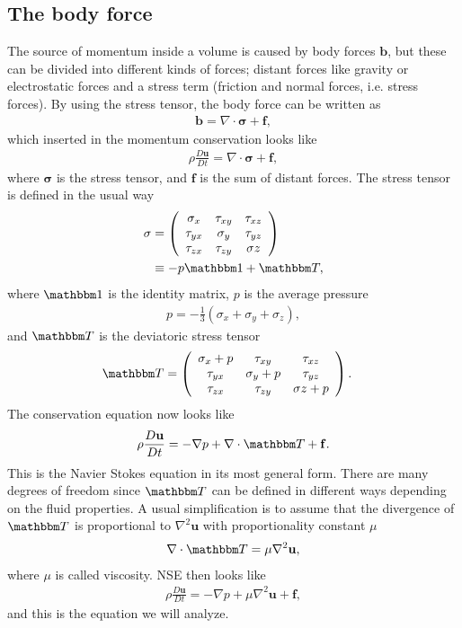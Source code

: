 \documentclass[a4paper,10pt]{article}
\renewcommand{\vec}[1]{\mathbf{#1}}
\renewcommand{\(}{\left(}
\renewcommand{\)}{\right)}
\begin{document}
\subsection{The body force}
The source of momentum inside a volume is caused by body forces $\vec b$, but these can be divided into different kinds of forces; distant forces like gravity or electrostatic forces and a stress term (friction and normal forces, i.e. stress forces). By using the stress tensor, the body force can be written as
\begin{align*}
  \vec b = \nabla \cdot \vec \sigma + \vec f,
\end{align*}
which inserted in the momentum conservation looks like
\begin{align*}
  \rho \frac{D\vec u}{D t} = \nabla \cdot \vec \sigma + \vec f,
\end{align*}
where $\vec \sigma$ is the stress tensor, and $\vec f$ is the sum of distant forces. The stress tensor is defined in the usual way
\begin{align*}
  \vec \sigma &= 
  \left (
  \begin{array}{c c c}
  \sigma_x & \tau_{xy} & \tau_{xz}\\
  \tau_{yx} & \sigma_{y} & \tau_{yz}\\
  \tau_{zx} & \tau_{zy} & \sigma{z}
  \end{array}
  \right )\\
  &\equiv -p\mathbbm 1 + \mathbbm T,
\end{align*}
where $\mathbbm 1$ is the identity matrix, $p$ is the average pressure
\begin{align*}
  p = -\frac{1}{3}(\sigma_x + \sigma_y + \sigma_z),
\end{align*}
and $\mathbbm T$ is the deviatoric stress tensor
\begin{align*}
  \mathbbm T &= 
  \left (
  \begin{array}{c c c}
  \sigma_x + p & \tau_{xy} & \tau_{xz}\\
  \tau_{yx} & \sigma_{y} + p & \tau_{yz}\\
  \tau_{zx} & \tau_{zy} & \sigma{z} + p
  \end{array}
  \right ).
\end{align*}
The conservation equation now looks like
\begin{align*}
  \rho \frac{D\vec u}{D t} = -\nabla p + \nabla\cdot \mathbbm T + \vec f.
\end{align*}
This is the Navier Stokes equation in its most general form. There are many degrees of freedom since $\mathbbm T$ can be defined in different ways depending on the fluid properties. A usual simplification is to assume that the divergence of $\mathbbm T$ is proportional to $\nabla^2 \vec u$ with proportionality constant $\mu$
\begin{align*}
  \nabla \cdot \mathbbm T = \mu \nabla^2 \vec u,
\end{align*}
where $\mu$ is called viscosity. NSE then looks like
\begin{align}
  \rho \frac{D\vec u}{D t} = -\nabla p + \mu\nabla^2 \vec u + \vec f,
\end{align}
and this is the equation we will analyze.
\end{document}
